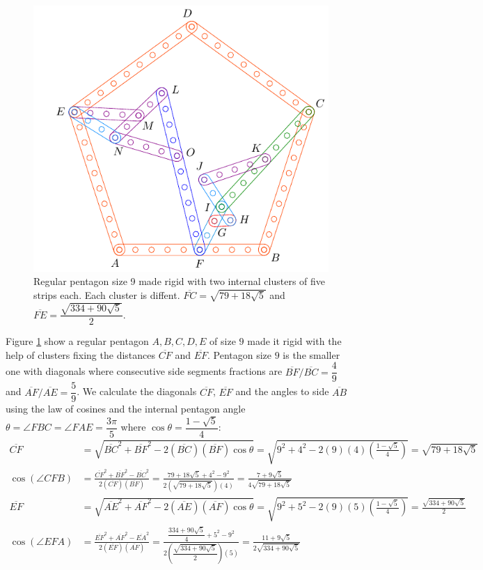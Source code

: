 \documentclass[11pt]{article}
\begin{document}
\begin{figure}[H]
 \centering
 \includegraphics[scale=0.9]{9/penta9b}
 \caption{Regular pentagon size 9 made rigid with two internal clusters of five strips each. Each cluster is diffent. $\overline{FC}=\sqrt{79 + 18\sqrt5}$ and $\overline{FE} = \dfrac{\sqrt{334 + 90\sqrt5}}2$.}
 \label{fig:penta9b}
\end{figure}

Figure \ref{fig:penta9b} show a regular pentagon $A,B,C,D,E$ of size $9$ made it rigid with the help of clusters fixing the distances $\overline{CF}$ and $\overline{EF}$. Pentagon size $9$ is the smaller one with diagonals where consecutive side segments fractions are $\overline{BF} / \overline{BC} =\dfrac{4}9$ and $\overline{AF} / \overline{AE} = \dfrac{5}9$. We calculate the diagonals $\overline{CF}$, $\overline{EF}$ and the angles to side $\overline{AB}$ using the law of cosines and the internal pentagon angle $\theta=\angle{FBC}=\angle{FAE}=\dfrac{3\pi}5$ where $\cos\theta = \dfrac{1-\sqrt5}4$:
\begin{align}
\overline{CF} &= \sqrt{
 \overline{BC}^2 + \overline{BF}^2 - 2(\overline{BC})(\overline{BF})\cos\theta } 
 = \sqrt{9^2 + 4^2 - 2(9)(4)\left(\frac{1-\sqrt5}4\right)} = \sqrt{79 + 18\sqrt5}\\
%
\cos(\angle{CFB}) &= 
 \frac{\overline{CF}^2 + \overline{BF}^2 - \overline{BC}^2}{2(\overline{CF})(\overline{BF})}
 = \frac{79 + 18\sqrt5 + 4^2 - 9^2}{2(\sqrt{79 + 18\sqrt5})(4)}
 = \frac{7 + 9\sqrt5}{4\sqrt{79 + 18\sqrt5}} \\
%
\overline{EF} &= \sqrt{
 \overline{AE}^2 + \overline{AF}^2 - 2(\overline{AE})(\overline{AF})\cos\theta} 
 = \sqrt{9^2 + 5^2 - 2(9)(5)\left(\frac{1-\sqrt5}4\right)} = \frac{\sqrt{334 + 90\sqrt5}}2\\
%
\cos(\angle{EFA}) &=
 \frac{\overline{EF}^2 + \overline{AF}^2 - \overline{EA}^2}{2(\overline{EF})(\overline{AF})}
 = \frac{\dfrac{334 + 90\sqrt5}4 + 5^2 - 9^2 }{2\left(\dfrac{\sqrt{334 + 90\sqrt5}}2\right)(5)}
 = \frac{11 + 9\sqrt5}{2\sqrt{334 + 90\sqrt5}}
\end{align}
\end{document}
